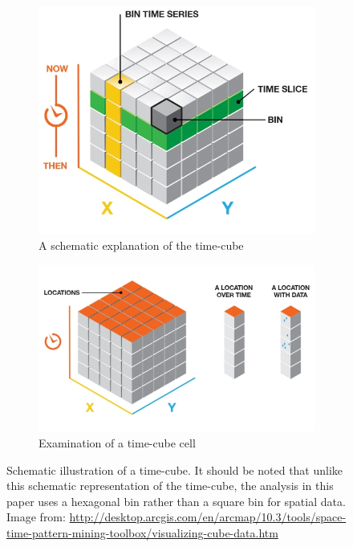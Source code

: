 \begin{figure}
	\centering
	
	
	\begin{subfigure}[b]{0.45\textwidth}
		\includegraphics[width=1\linewidth]{Figures/ChapterIV/TimeCube}
		\caption{A schematic explanation of the time-cube }
		\label{fig:Timecube}
	\end{subfigure}
	\begin{subfigure}[b]{0.45\textwidth}
		\includegraphics[width=1\linewidth]{Figures/ChapterIV/Time_Cube_Slice}
		\caption{Examination of a time-cube cell}
		\label{fig:timesclice}
	\end{subfigure}
	
	\caption[ESRI Schematic Illustrations of a Time-Cube]{Schematic illustration of a time-cube. It should be noted that unlike this schematic representation of the time-cube, the analysis in this paper uses a hexagonal bin rather than a square bin for spatial data.  Image from: \url{http://desktop.arcgis.com/en/arcmap/10.3/tools/space-time-pattern-mining-toolbox/visualizing-cube-data.htm}}
	\label{fig:timecube1}
\end{figure}


